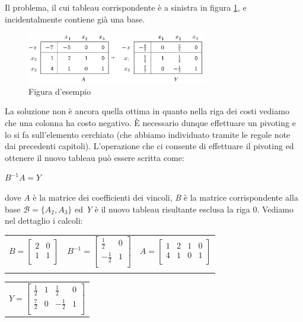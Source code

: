 \documentclass[11pt]{book}
\begin{document}
Il problema, il cui tableau corrispondente \`e a sinistra in figura
\ref{cap5tab1}, e incidentalmente contiene gi\`a una base.

\begin{figure}[h!]
  \centering
  \includegraphics[width=0.7\textwidth]{images/cap5tab1.png}
  \caption{Figura d'esempio}
  \label{cap5tab1}
\end{figure}

La soluzione non \`e ancora quella ottima in quanto nella riga dei
costi vediamo che una colonna ha costo negativo. \`E necessario dunque
effettuare un pivoting e lo si fa sull'elemento cerchiato (che abbiamo
individuato tramite le regole note dai precedenti
capitoli). L'operazione che ci consente di effettuare il pivoting ed
ottenere il nuovo tableau pu\`o essere scritta come:

\begin{center}
$B^{-1}A = Y$  
\end{center}

dove {\em A} \`e la matrice dei coefficienti dei vincoli, {\em B} \`e
la matrice corrispondente alla base $\mathcal{B} = \{ A_2, A_3\}$ ed
{\em Y} \`e il nuovo tableau risultante esclusa la riga 0. Vediamo nel
dettaglio i calcoli:

\vspace{11pt}
\begin{center}
\begin{tabular}{lll}
$B = 
\begin{bmatrix}
  2 & 0 \\
  1 & 1 \\
\end{bmatrix}
$ &
$B^{-1} = 
\begin{bmatrix}
  \frac{1}{2} & 0 \\
  -\frac{1}{2} & 1 \\
\end{bmatrix}
$ &
$A =
\begin{bmatrix}
1 & 2 & 1 & 0 \\
4 & 1 & 0 & 1 \\
\end{bmatrix}
$ \\
&
\end{tabular}
\vspace{11pt}

\begin{tabular}{l}
$Y = 
\begin{bmatrix}
  \frac{1}{2} & 1 & \frac{1}{2} & 0 \\
  \frac{7}{2} & 0 & -\frac{1}{2} & 1 \\
\end{bmatrix}$
\end{tabular}
\end{center}
\vspace{11pt}
\end{document}

